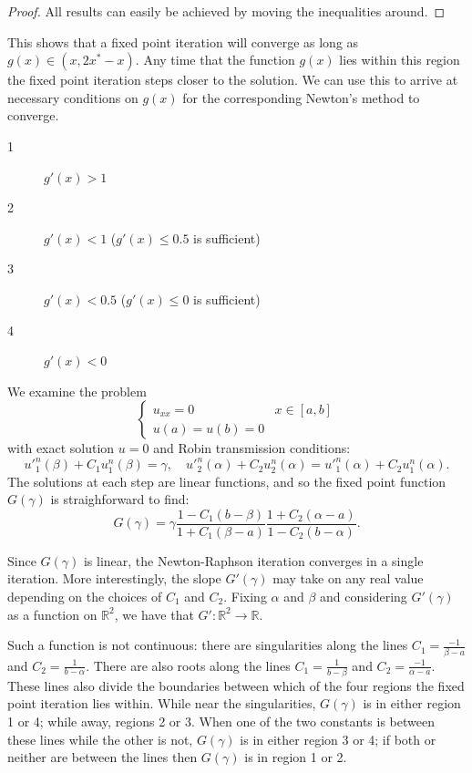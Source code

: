 \documentclass{book}
\begin{document}
\begin{proof}
All results can easily be achieved by moving the inequalities around.
\end{proof}

This shows that a fixed point iteration will converge as long as $g(x) \in (x,2x^* - x)$.
Any time that the function $g(x)$ lies within this region the fixed point iteration steps closer to the solution.
We can use this to arrive at necessary conditions on $g(x)$ for the corresponding Newton's method to converge.

\begin{description}
\item[1] $g'(x) > 1$
\item[2] $g'(x) < 1$ ($g'(x) \leq 0.5$ is sufficient)
\item[3] $g'(x) < 0.5$ ($g'(x) \leq 0$ is sufficient)
\item[4] $g'(x) < 0$
\end{description}

We examine the problem
\begin{equation*}
\begin{cases} u_{xx} = 0 & x \in [a,b] \\ u(a) = u(b) = 0 \end{cases}
\end{equation*}
with exact solution $u=0$ and Robin transmission conditions:
\begin{equation*}
u'^n_1(\beta) + C_1 u^n_1(\beta) = \gamma, \quad u'^n_2(\alpha) + C_2 u^n_2(\alpha) = u'^n_1(\alpha) + C_2 u^n_1(\alpha) .
\end{equation*}
The solutions at each step are linear functions, and so the fixed point function $G(\gamma)$ is straighforward to find:
\begin{equation*}
G(\gamma) = \gamma \frac{1 - C_1(b-\beta)}{1 + C_1(\beta-a)} \frac{1 + C_2(\alpha-a)}{1 - C_2(b - \alpha)} .
\end{equation*}

Since $G(\gamma)$ is linear, the Newton-Raphson iteration converges in a single iteration.
More interestingly, the slope $G'(\gamma)$ may take on any real value depending on the choices of $C_1$ and $C_2$.
Fixing $\alpha$ and $\beta$ and considering $G'(\gamma)$ as a function on $\mathbb{R}^2$, we have that $G':\mathbb{R}^2 \rightarrow \mathbb{R}$.

Such a function is not continuous: there are singularities along the lines $C_1 = \frac{-1}{\beta-a}$ and $C_2 = \frac{1}{b-\alpha}$.
There are also roots along the lines $C_1 = \frac{1}{b-\beta}$ and $C_2 = \frac{-1}{\alpha-a}$.
These lines also divide the boundaries between which of the four regions the fixed point iteration lies within.
While near the singularities, $G(\gamma)$ is in either region 1 or 4; while away, regions 2 or 3.
When one of the two constants is between these lines while the other is not, $G(\gamma)$ is in either region 3 or 4; if both or neither are between the lines then $G(\gamma)$ is in region 1 or 2.
\end{document}
